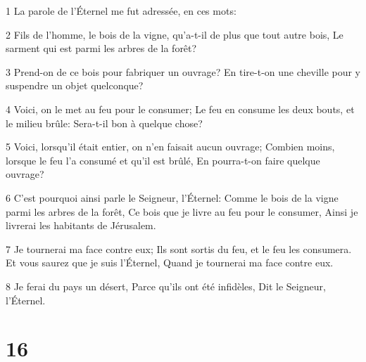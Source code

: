 \par 1 La parole de l'Éternel me fut adressée, en ces mots:
\par 2 Fils de l'homme, le bois de la vigne, qu'a-t-il de plus que tout autre bois, Le sarment qui est parmi les arbres de la forêt?
\par 3 Prend-on de ce bois pour fabriquer un ouvrage? En tire-t-on une cheville pour y suspendre un objet quelconque?
\par 4 Voici, on le met au feu pour le consumer; Le feu en consume les deux bouts, et le milieu brûle: Sera-t-il bon à quelque chose?
\par 5 Voici, lorsqu'il était entier, on n'en faisait aucun ouvrage; Combien moins, lorsque le feu l'a consumé et qu'il est brûlé, En pourra-t-on faire quelque ouvrage?
\par 6 C'est pourquoi ainsi parle le Seigneur, l'Éternel: Comme le bois de la vigne parmi les arbres de la forêt, Ce bois que je livre au feu pour le consumer, Ainsi je livrerai les habitants de Jérusalem.
\par 7 Je tournerai ma face contre eux; Ils sont sortis du feu, et le feu les consumera. Et vous saurez que je suis l'Éternel, Quand je tournerai ma face contre eux.
\par 8 Je ferai du pays un désert, Parce qu'ils ont été infidèles, Dit le Seigneur, l'Éternel.

\chapter{16}


